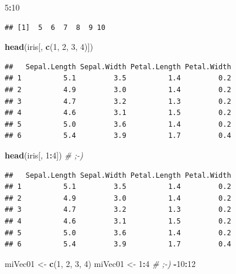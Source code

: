 \documentclass[]{book}
\newenvironment{Shaded}{\begin{snugshade}}{\end{snugshade}}
\newcommand{\KeywordTok}[1]{\textcolor[rgb]{0.13,0.29,0.53}{\textbf{#1}}}
\newcommand{\DecValTok}[1]{\textcolor[rgb]{0.00,0.00,0.81}{#1}}
\newcommand{\StringTok}[1]{\textcolor[rgb]{0.31,0.60,0.02}{#1}}
\newcommand{\CommentTok}[1]{\textcolor[rgb]{0.56,0.35,0.01}{\textit{#1}}}
\newcommand{\OperatorTok}[1]{\textcolor[rgb]{0.81,0.36,0.00}{\textbf{#1}}}
\newcommand{\NormalTok}[1]{#1}
\begin{document}
\begin{Shaded}
\begin{Highlighting}[]
\DecValTok{5}\OperatorTok{:}\DecValTok{10}
\end{Highlighting}
\end{Shaded}

\begin{verbatim}
## [1]  5  6  7  8  9 10
\end{verbatim}

\begin{Shaded}
\begin{Highlighting}[]
\KeywordTok{head}\NormalTok{(iris[, }\KeywordTok{c}\NormalTok{(}\DecValTok{1}\NormalTok{, }\DecValTok{2}\NormalTok{, }\DecValTok{3}\NormalTok{, }\DecValTok{4}\NormalTok{)])}
\end{Highlighting}
\end{Shaded}

\begin{verbatim}
##   Sepal.Length Sepal.Width Petal.Length Petal.Width
## 1          5.1         3.5          1.4         0.2
## 2          4.9         3.0          1.4         0.2
## 3          4.7         3.2          1.3         0.2
## 4          4.6         3.1          1.5         0.2
## 5          5.0         3.6          1.4         0.2
## 6          5.4         3.9          1.7         0.4
\end{verbatim}

\begin{Shaded}
\begin{Highlighting}[]
\KeywordTok{head}\NormalTok{(iris[, }\DecValTok{1}\OperatorTok{:}\DecValTok{4}\NormalTok{]) }\CommentTok{# ;-)}
\end{Highlighting}
\end{Shaded}

\begin{verbatim}
##   Sepal.Length Sepal.Width Petal.Length Petal.Width
## 1          5.1         3.5          1.4         0.2
## 2          4.9         3.0          1.4         0.2
## 3          4.7         3.2          1.3         0.2
## 4          4.6         3.1          1.5         0.2
## 5          5.0         3.6          1.4         0.2
## 6          5.4         3.9          1.7         0.4
\end{verbatim}

\begin{Shaded}
\begin{Highlighting}[]
\NormalTok{miVec01 <-}\StringTok{ }\KeywordTok{c}\NormalTok{(}\DecValTok{1}\NormalTok{, }\DecValTok{2}\NormalTok{, }\DecValTok{3}\NormalTok{, }\DecValTok{4}\NormalTok{)}
\NormalTok{miVec01 <-}\StringTok{ }\DecValTok{1}\OperatorTok{:}\DecValTok{4} \CommentTok{# ;-)}
\OperatorTok{-}\DecValTok{10}\OperatorTok{:}\DecValTok{12}
\end{Highlighting}
\end{Shaded}
\end{document}
